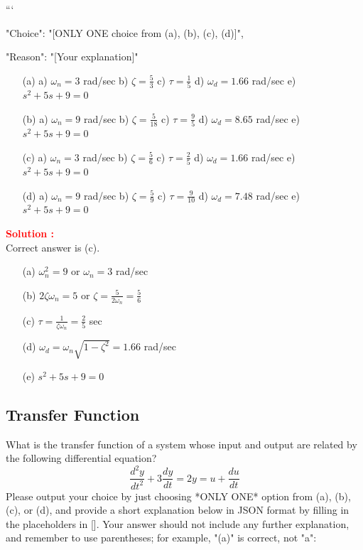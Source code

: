 \documentclass[12pt]{article}
\begin{document}
```
{

"Choice": "[ONLY ONE choice from (a), (b), (c), (d)]",

"Reason": "[Your explanation]"

}

\begin{itemize}
    \item[(a)] a) \(\omega_n = 3\) rad/sec b) \(\zeta = \frac{5}{3}\) c) \(\tau = \frac{1}{5}\) d) \(\omega_d = 1.66\) rad/sec e) \(s^2+5s+9=0\)
    \item[(b)] a) \(\omega_n = 9\) rad/sec b) \(\zeta = \frac{5}{18}\) c) \(\tau = \frac{9}{5}\) d) \(\omega_d = 8.65\) rad/sec e) \(s^2+5s+9=0\)
    \item[(c)] a) \(\omega_n = 3\) rad/sec b) \(\zeta = \frac{5}{6}\) c) \(\tau = \frac{2}{5}\) d) \(\omega_d = 1.66\) rad/sec e) \(s^2+5s+9=0\)
    \item[(d)] a) \(\omega_n = 9\) rad/sec b) \(\zeta = \frac{5}{9}\) c) \(\tau = \frac{9}{10}\) d) \(\omega_d = 7.48\) rad/sec e) \(s^2+5s+9=0\)
\end{itemize}

\textbf{\textcolor{red}{Solution :}} \\
Correct answer is (c).\\
\begin{itemize}
    \item[(a)] \(\omega_n^2 = 9\) or \(\omega_n = 3\) rad/sec
    \item[(b)] \(2\zeta \omega_n = 5\) or \(\zeta = \frac{5}{2\omega_n} = \frac{5}{6}\)
    \item[(c)] \(\tau = \frac{1}{\zeta \omega_n} = \frac{2}{5}\) sec
    \item[(d)] \(\omega_d = \omega_n \sqrt{1-\zeta^2} = 1.66\) rad/sec
    \item[(e)] \(s^2+5s+9 = 0\)
\end{itemize}

\clearpage
\subsection{Transfer Function}

What is the transfer function of a system whose input and output are related by the following differential equation?
\begin{equation}
    \frac{d^2y}{dt^2} + 3\frac{dy}{dt} = 2y = u + \frac{du}{dt}
\end{equation}
Please output your choice by just choosing *ONLY ONE* option from (a), (b), (c), or (d), and provide a short explanation below in JSON format by filling in the placeholders in []. Your answer should not include any further explanation, and remember to use parentheses; for example, "(a)" is correct, not "a":
\end{document}

